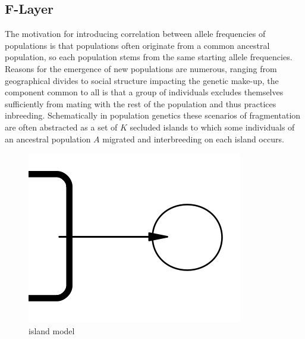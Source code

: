 \documentclass[a4paper, 11pt]{article}
\begin{document}




\subsection{F-Layer}

The motivation for introducing correlation between allele frequencies of populations is that populations often originate from a common ancestral population, so each population stems from the same starting allele frequencies. Reasons for the emergence of new populations are numerous, ranging from geographical divides to social structure impacting the genetic make-up, the component common to all is that a group of individuals excludes themselves sufficiently from mating with the rest of the population and thus practices inbreeding. Schematically in population genetics these scenarios of fragmentation are often abstracted as a set of $K$ secluded islands to which some individuals of an ancestral population $A$ migrated and interbreeding on each island occurs.

\begin{figure}
\centering
\includegraphics[scale=0.5]{level_1}
\caption{island model}
\end{figure}
\end{document}
